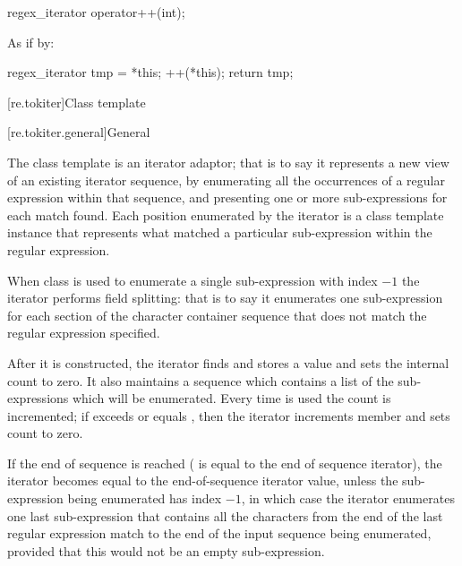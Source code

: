 %
\begin{itemdecl}
regex_iterator operator++(int);
\end{itemdecl}

\begin{itemdescr}
\pnum
\effects
As if by:
\begin{codeblock}
regex_iterator tmp = *this;
++(*this);
return tmp;
\end{codeblock}
\end{itemdescr}

[re.tokiter]{Class template }

[re.tokiter.general]{General}

\pnum
{}%
The class template  is an iterator adaptor; that
is to say it represents a new view of an existing iterator sequence,
by enumerating all the occurrences of a regular expression within that
sequence, and presenting one or more sub-expressions for each match
found. Each position enumerated by the iterator is a  class
template instance that represents what matched a particular sub-expression
within the regular expression.

\pnum
When class  is used to enumerate a
single sub-expression with index $-1$ the iterator performs field
splitting: that is to say it enumerates one sub-expression for each section of
the character container sequence that does not match the regular
expression specified.

\pnum
{}%
After it is constructed, the iterator finds and stores a value
and sets the internal count  to zero. It also maintains a sequence
 which contains a list of the sub-expressions which will be
enumerated. Every time  is used
the count  is incremented; if  exceeds or equals ,
then the iterator increments member 
and sets count  to zero.

\pnum
If the end of sequence is reached ( is equal to the end of
sequence iterator), the iterator becomes equal to the end-of-sequence
iterator value, unless the sub-expression being enumerated has index $-1$,
in which case the iterator enumerates one last sub-expression that contains
all the characters from the end of the last regular expression match to the
end of the input sequence being enumerated, provided that this would not be an
empty sub-expression.


